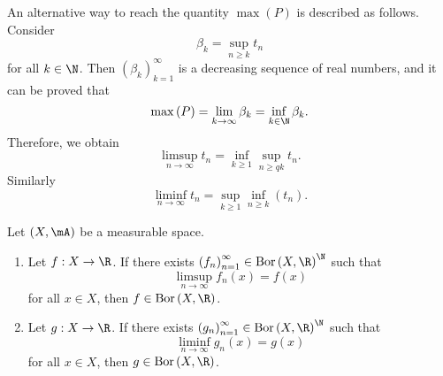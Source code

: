 \documentclass[pmath450]{subfiles}
\begin{document}
    An alternative way to reach the quantity $\max\left( P \right)$ is described as follows. Consider
    \begin{equation*}
        \beta_k = \sup_{n\geq k}t_n
    \end{equation*}
    for all $k\in\N$. Then $\left( \beta_{k} \right)^{\infty}_{k=1}$ is a decreasing sequence of real numbers, and it can be proved that
    \begin{equation*}
        \max\left( P \right) = \lim_{k\to\infty}\beta_k = \inf_{k\in\N}\beta_k.
    \end{equation*}
    Therefore, we obtain
    \begin{equation}
        \limsup_{n\to\infty} t_n = \inf_{k\geq 1}\sup_{n\ge qk}t_n.
    \end{equation}
    Similarly
    \begin{equation}
        \liminf_{n\to\infty}t_n = \sup_{k\geq 1}\inf_{n\geq k}\left( t_n \right).
    \end{equation}

    \begin{prop}{}
        Let $\left( X,\mA \right)$ be a measurable space.
        \begin{enumerate}
            \item Let $f:X\to\R$. If there exists $\left( f_{n} \right)^{\infty}_{n=1}\in\bor\left( X,\R \right)^{\N}$ such that
                \begin{equation*}
                    \limsup_{n\to\infty}f_n\left( x \right) = f\left( x \right)
                \end{equation*}
                for all $x\in X$, then $f\in\bor\left( X,\R \right)$.
            \item Let $g:X\to\R$. If there exists $\left( g_{n} \right)^{\infty}_{n=1}\in\bor\left( X,\R \right)^{\N}$ such that
                \begin{equation*}
                    \liminf_{n\to\infty}g_n\left( x \right) = g\left( x \right)
                \end{equation*}
                for all $x\in X$, then $g\in\bor\left( X,\R \right)$.
        \end{enumerate}
    \end{prop}
\end{document}
